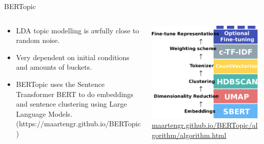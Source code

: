 \documentclass[xcolor={dvipsnames},aspectratio=169]{beamer}
\begin{document}
\begin{frame}{BERTopic}
\begin{columns}
\begin{column}{0.5\textwidth}
    \begin{itemize}
    \item LDA topic modelling is awfully close to random noise. 
    \item Very dependent on initial conditions and amounts of buckets.
    \item BERTopic uses the Sentence Transformer BERT to do embeddings and sentence clustering using Large Language Models. (https://maartengr.github.io/BERTopic)
\end{itemize}
\end{column}
\begin{column}{0.5\textwidth}
    \includegraphics[width=\textwidth]{bert.pdf}
    {\tiny \url{maartengr.github.io/BERTopic/algorithm/algorithm.html}}
\end{column}
\end{columns}

    
\end{frame}
\end{document}
